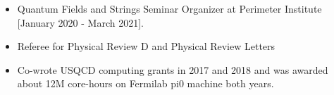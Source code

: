 \renewcommand{\arraystretch}{1.1}

	\begin{itemize}
	 \item Quantum Fields and Strings Seminar Organizer at Perimeter Institute [January 2020 - March 2021].
	  \item Referee for Physical Review D and Physical Review Letters %
	  \item Co-wrote USQCD computing grants in 2017 and 2018 and was awarded about 12M core-hours on Fermilab pi0 machine both years.
	  \end{itemize}

